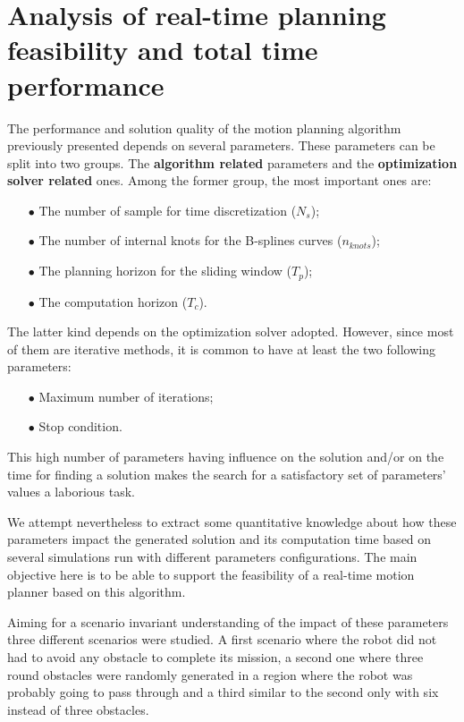 \section{Analysis of real-time planning feasibility and total time performance}

The performance and solution quality of the motion planning algorithm previously presented depends on several parameters. These parameters can be split into two groups. The \textbf{algorithm related} parameters and the \textbf{optimization solver related} ones. Among the former group, the most important ones are:
\begin{itemize}
\item[$\bullet$] The number of sample for time discretization ($N_s$);
\item[$\bullet$] The number of internal knots for the B-splines curves ($n_{knots}$);
\item[$\bullet$] The planning horizon for the sliding window ($T_p$);
\item[$\bullet$] The computation horizon ($T_c$).
\end{itemize}

The latter kind depends on the optimization solver adopted. However, since most of them are iterative methods, it is common to have at least the two following parameters:
\begin{itemize}
\item[$\bullet$] Maximum number of iterations;
\item[$\bullet$] Stop condition.
\end{itemize}


This high number of parameters having influence on the solution and/or on the time for finding a solution makes the search for a satisfactory set of parameters' values a laborious task.

We attempt nevertheless to extract some quantitative knowledge about how these parameters impact the generated solution and its computation time based on several simulations run with different parameters configurations.
The main objective here is to be able to support the feasibility of a real-time motion planner based on this algorithm.

%
Aiming for a scenario invariant understanding of the impact of these parameters three different scenarios were studied. A first scenario where the robot did not had to avoid any obstacle
to complete its mission, a second one where three round obstacles were randomly generated in a region where the robot was probably going to pass through and a third similar to the second
only with six instead of three obstacles.

